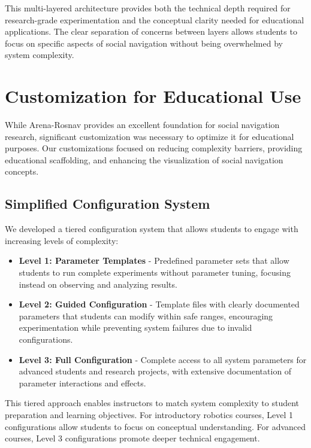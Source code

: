 This multi-layered architecture provides both the technical depth required for 
research-grade experimentation and the conceptual clarity needed for educational 
applications. The clear separation of concerns between layers allows students to focus 
on specific aspects of social navigation without being overwhelmed by system complexity.



\section{Customization for Educational Use}

While Arena-Rosnav provides an excellent foundation for social navigation research, 
significant customization was necessary to optimize it for educational purposes. Our 
customizations focused on reducing complexity barriers, providing educational scaffolding, 
and enhancing the visualization of social navigation concepts.

\subsection{Simplified Configuration System}
We developed a tiered configuration system that allows students to engage with increasing 
levels of complexity:
\begin{itemize}
    \item \textbf{Level 1: Parameter Templates} - Predefined parameter sets that 
    allow students to run complete experiments without parameter tuning, focusing
    instead on observing and analyzing results.
    \item \textbf{Level 2: Guided Configuration} - Template files with clearly documented 
    parameters that students can modify within safe ranges, encouraging experimentation 
    while preventing system failures due to invalid configurations.
    \item \textbf{Level 3: Full Configuration} - Complete access to all system parameters 
    for advanced students and research projects, with extensive documentation of parameter 
    interactions and effects.
\end{itemize}
This tiered approach enables instructors to match system complexity to student preparation 
and learning objectives. For introductory robotics courses, Level 1 configurations allow 
students to focus on conceptual understanding. For advanced courses, Level 3 configurations 
promote deeper technical engagement.

